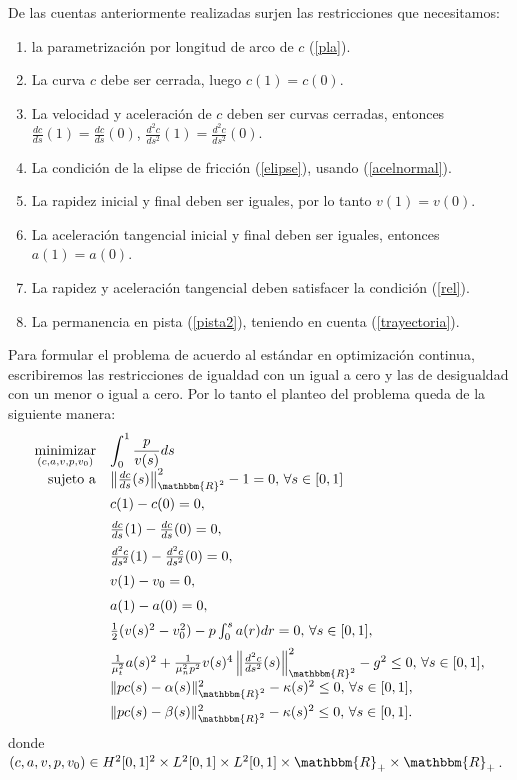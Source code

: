 \documentclass[a4paper,10pt]{book}
\newcommand{\R}{\mathbbm{R}}
\begin{document}
De las cuentas anteriormente realizadas surjen las restricciones que necesitamos:
\begin{enumerate}
\item la parametrización por longitud de arco de $c$ (\ref{pla}).
\item La curva $c$ debe ser cerrada, luego $c(1)=c(0)$.
\item La velocidad y aceleraci\'on de $c$ deben ser curvas cerradas, entonces $\frac{dc}{ds}(1)=\frac{dc}{ds}(0)$, $\frac{d^2c}{ds^2}(1)=\frac{d^2c}{ds^2}(0)$.

\item La condición de la elipse de fricción (\ref{elipse}), usando (\ref{acelnormal}).

\item La rapidez inicial y final deben ser iguales, por lo tanto $v(1)=v(0)$.

\item La aceleraci\'on tangencial inicial y final deben ser iguales, entonces $a(1)=a(0)$. 

\item La rapidez y aceleraci\'on tangencial deben satisfacer la condición (\ref{rel}).

\item La permanencia en pista (\ref{pista2}), teniendo en cuenta (\ref{trayectoria}).
\end{enumerate}

Para formular el problema de acuerdo al est\'andar en optimizaci\'on continua, escribiremos las restricciones de igualdad con un igual a cero y las de desigualdad con un menor o igual a cero. Por lo tanto el planteo del problema queda de la siguiente manera:
\[
\begin{array}{rl}
\displaystyle \mathop{\mathrm{minimizar}}_{(c,a,v,p,v_0)} & \displaystyle \int_{0}^{1} \frac{p}{v(s)}ds \\
 \mathrm{sujeto \ a} & \left\|\frac{dc}{ds}(s)\right\|_{\R^2}^2-1=0,\,\forall s\in[0,1]\\[2mm]
                     & c(1)-c(0)=0,\\[2mm]
                     & \frac{dc}{ds}(1)-\frac{dc}{ds}(0)=0,\\[2mm]
                     & \frac{d^2c}{ds^2}(1)-\frac{d^2c}{ds^2}(0)=0,\\[2mm]
                     & v(1)-v_0=0,\\[2mm]
                     & a(1)-a(0)=0,\\[2mm]
                     &  \frac{1}{2}(v(s)^2-v_0^2)-p\int_0^s a(r)dr=0,\, \forall s\in[0,1],\\ [2mm]
                     & \frac{1}{\mu_t^2} a(s)^2 + \frac{1}{\mu_n^2 p^2}v(s)^4\left\| \frac{d^2 c}{ds^2}(s) \right\|_{\R^2}^2-g^2\leq 0,\,\forall s\in[0,1],\\[2mm]
                     &  \|pc(s)-\alpha(s)\|_{\R^2}^2-\kappa(s)^2 \leq 0,\,\forall s\in[0,1], \\[2mm]
                     &  \|pc(s)-\beta(s)\|_{\R^2}^2-\kappa(s)^2 \leq 0,\, \forall s\in[0,1].
  \end{array}
\]
donde $(c,a,v,p,v_0)\in H^2[0,1]^2\times L^2[0,1]\times L^2[0,1]\times\R_+\times \R_+$.
\end{document}
